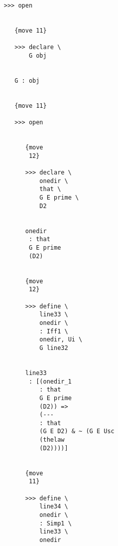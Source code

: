 \documentclass[12pt]{article}
\begin{document}
\begin{verbatim}
                              >>> open


                                 {move 11}

                                 >>> declare \
                                     G obj


                                 G : obj


                                 {move 11}

                                 >>> open


                                    {move 
                                     12}

                                    >>> declare \
                                        onedir \
                                        that \
                                        G E prime \
                                        D2


                                    onedir 
                                     : that 
                                     G E prime 
                                     (D2)


                                    {move 
                                     12}

                                    >>> define \
                                        line33 \
                                        onedir \
                                        : Iff1 \
                                        onedir, Ui \
                                        G line32


                                    line33 
                                     : [(onedir_1 
                                        : that 
                                        G E prime 
                                        (D2)) => 
                                        (--- 
                                        : that 
                                        (G E D2) & ~ (G E Usc 
                                        (thelaw 
                                        (D2))))]


                                    {move 
                                     11}

                                    >>> define \
                                        line34 \
                                        onedir \
                                        : Simp1 \
                                        line33 \
                                        onedir



\end{verbatim}
\end{document}
